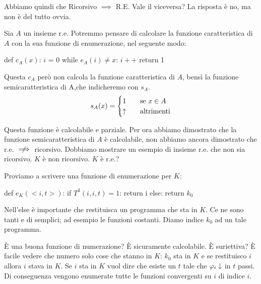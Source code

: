 
Abbiamo quindi che Ricorsivo $\implies$ R.E. Vale il viceversa? La risposta è no, ma non è del tutto
ovvia.

Sia $A$ un insieme r.e. Potremmo pensare di calcolare la funzione caratteristica di $A$ con la sua
funzione di enumerazione, nel seguente modo:
\begin{python}
    def $c_{A}(x)$:
        $i$ = 0
        while $e_{A}(i) \not= x$:
            $i++$ 
        return 1
\end{python}

Questa $c_{A}$ però non calcola la funzione caratteristica di $A$, bensì la funzione
semicaratteristica di A,che indicheremo con $s_{A}$.
\begin{equation*}
    s_{A}(x) =
    \begin{cases}
        1 \quad &\text{se $x \in A$} \\
        \uparrow \quad &\text{altrimenti}
    \end{cases}
\end{equation*}

Questa funzione è calcolabile e parziale. Per ora abbiamo dimostrato che la funzione
semicaratteristica di $A$ è calcolabile, non abbiamo ancora dimostrato che r.e. $\centernot\implies$
ricorsivo. Dobbiamo mostrare un esempio di insieme r.e. che non sia ricorsivo. $K$ è non
ricorsivo. $K$ è r.e.?

Proviamo a scrivere una funzione di enumerazione per $K$:
\begin{python}
    def $e_{K}(<i,t>)$:
        if $T^{3}(i,i,t) = 1$:
            return i
        else:
            return $k_{0}$
\end{python}
        
Nell'else è importante che restituisca un programma che sta in $K$. Ce ne sono tanti e di semplici;
ad esempio le funzioni costanti. Diamo indice $k_{0}$ ad un tale programma.

È una buona funzione di numerazione? È sicuramente calcolabile. È suriettiva? È facile vedere che
numero solo cose che stanno in $K$: $k_{0}$ sta in $K$ e se restituisco $i$ allora $i$ stava in $K$.
Se $i$ sta in $K$ vuol dire che esiste un $t$ tale che $\varphi_{i} \downarrow$ in $t$ passi. Di conseguenza
vengono enumerate tutte le funzioni convergenti su $i$ di indice $i$. 


